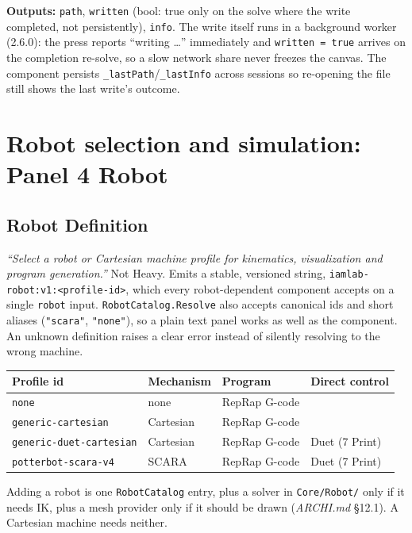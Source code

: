 \documentclass[11pt]{article}
\newcommand{\param}[1]{\texttt{#1}}
\begin{document}
\textbf{Outputs:} \param{path}, \param{written} (bool: true only on
the solve where the write completed, not persistently), \param{info}.
The write itself runs in a background worker (2.6.0): the press reports
``writing \ldots'' immediately and \param{written = true} arrives on the
completion re-solve, so a slow network share never freezes the canvas.
The component persists \param{\_lastPath}/\param{\_lastInfo}
across sessions so re-opening the file still shows the last write's
outcome.

\section{Robot selection and simulation: Panel 4 Robot}

\subsection{Robot Definition}

\emph{``Select a robot or Cartesian machine profile for kinematics,
visualization and program generation.''} Not Heavy. Emits a stable,
versioned string, \texttt{iamlab-robot:v1:<profile-id>}, which every
robot-dependent component accepts on a single \param{robot} input.
\param{RobotCatalog.Resolve} also accepts canonical ids and short
aliases (\texttt{"scara"}, \texttt{"none"}), so a
plain text panel works as well as the component. An unknown definition
raises a clear error instead of silently resolving to the wrong
machine.

\begin{longtable}{@{}p{4.2cm}p{2.2cm}p{2.6cm}p{3.6cm}@{}}
\toprule
\textbf{Profile id} & \textbf{Mechanism} & \textbf{Program} & \textbf{Direct control} \\
\midrule
\endhead
\param{none} & none & RepRap G-code & \\
\param{generic-cartesian} & Cartesian & RepRap G-code & \\
\param{generic-duet-cartesian} & Cartesian & RepRap G-code & Duet (7 Print) \\
\param{potterbot-scara-v4} & SCARA & RepRap G-code & Duet (7 Print) \\
\bottomrule
\end{longtable}

Adding a robot is one \param{RobotCatalog} entry, plus a solver in
\param{Core/Robot/} only if it needs IK, plus a mesh provider only if it
should be drawn (\emph{ARCHI.md} \S 12.1). A Cartesian machine needs
neither.
\end{document}
